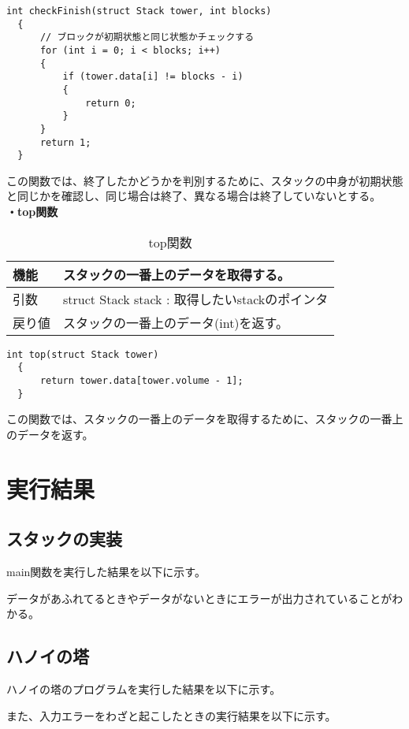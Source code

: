 \documentclass[dvipdfmx]{jsarticle}
\begin{document}
\begin{lstlisting}[caption={checkFinish関数}, label={lst:checkfinish_func}]
  int checkFinish(struct Stack tower, int blocks)
  {
      // ブロックが初期状態と同じ状態かチェックする
      for (int i = 0; i < blocks; i++)
      {
          if (tower.data[i] != blocks - i)
          {
              return 0;
          }
      }
      return 1;
  }
\end{lstlisting}
この関数では、終了したかどうかを判別するために、スタックの中身が初期状態と同じかを確認し、同じ場合は終了、異なる場合は終了していないとする。
\\
\textbf{・top関数}
\begin{table}[ht]
  \centering
  \caption{top関数}
  \begin{tabular}{|p{5cm}|p{10cm}|}
    \hline
    機能  & スタックの一番上のデータを取得する。                         \\
    \hline
    引数  & struct Stack stack : 取得したいstackのポインタ \\
    \hline
    戻り値 & スタックの一番上のデータ(int)を返す。                   \\
    \hline
  \end{tabular}
  \label{tab:top_func}
\end{table}
\begin{lstlisting}[caption={tower.c}, label={lst:towerc}]
  int top(struct Stack tower)
  {
      return tower.data[tower.volume - 1];
  }
\end{lstlisting}
この関数では、スタックの一番上のデータを取得するために、スタックの一番上のデータを返す。
\section{実行結果}
\subsection{スタックの実装}
main関数を実行した結果を以下に示す。

データがあふれてるときやデータがないときにエラーが出力されていることがわかる。
\subsection{ハノイの塔}
ハノイの塔のプログラムを実行した結果を以下に示す。

また、入力エラーをわざと起こしたときの実行結果を以下に示す。\\
\end{document}
